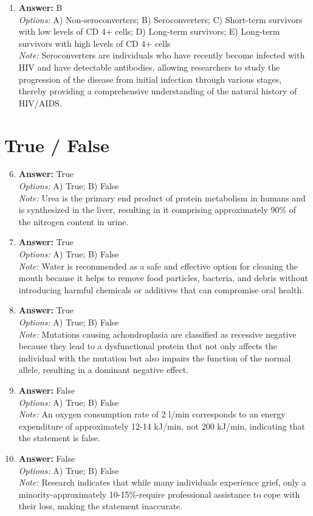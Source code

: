 \documentclass[12pt]{article}
\begin{document}
\begin{enumerate}[label=\arabic*.]
\item \textbf{Answer:} B
\\ \textit{Options:} A) Non-seroconverters; B) Seroconverters; C) Short-term survivors with low levels of CD 4+ cells; D) Long-term survivors; E) Long-term survivors with high levels of CD 4+ cells
\\ \textit{Note:} Seroconverters are individuals who have recently become infected with HIV and have detectable antibodies, allowing researchers to study the progression of the disease from initial infection through various stages, thereby providing a comprehensive understanding of the natural history of HIV/AIDS.
\end{enumerate}

\section*{True / False}
\begin{enumerate}[label=\arabic*.]
\setcounter{enumi}{5}
\item \textbf{Answer:} True
\\ \textit{Options:} A) True; B) False
\\ \textit{Note:} Urea is the primary end product of protein metabolism in humans and is synthesized in the liver, resulting in it comprising approximately 90\% of the nitrogen content in urine.
\item \textbf{Answer:} True
\\ \textit{Options:} A) True; B) False
\\ \textit{Note:} Water is recommended as a safe and effective option for cleaning the mouth because it helps to remove food particles, bacteria, and debris without introducing harmful chemicals or additives that can compromise oral health.
\item \textbf{Answer:} True
\\ \textit{Options:} A) True; B) False
\\ \textit{Note:} Mutations causing achondroplasia are classified as recessive negative because they lead to a dysfunctional protein that not only affects the individual with the mutation but also impairs the function of the normal allele, resulting in a dominant negative effect.
\item \textbf{Answer:} False
\\ \textit{Options:} A) True; B) False
\\ \textit{Note:} An oxygen consumption rate of 2 l/min corresponds to an energy expenditure of approximately 12-14 kJ/min, not 200 kJ/min, indicating that the statement is false.
\item \textbf{Answer:} False
\\ \textit{Options:} A) True; B) False
\\ \textit{Note:} Research indicates that while many individuals experience grief, only a minority-approximately 10-15\%-require professional assistance to cope with their loss, making the statement inaccurate.
\end{enumerate}
\end{document}
